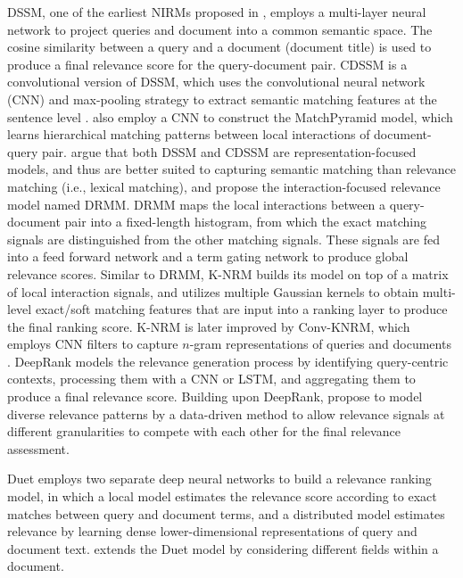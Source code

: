 \documentclass[11pt,a4paper]{article}
\begin{document}
DSSM, one of the earliest NIRMs proposed in \cite{DBLP:conf/cikm/HuangHGDAH13}, employs a multi-layer neural network to project queries and document into a common semantic space. The cosine similarity between a query and a document (document title) is used to produce a final relevance score for the query-document pair. CDSSM is a convolutional version of DSSM, which uses the convolutional neural network (CNN) and max-pooling strategy to extract semantic matching features at the sentence level \cite{DBLP:conf/www/ShenHGDM14}. \cite{DBLP:journals/corr/PangLGXC16} also employ a CNN to construct the MatchPyramid model, which learns hierarchical matching patterns between local interactions of document-query pair. \cite{DBLP:conf/cikm/GuoFAC16} argue that both DSSM and CDSSM are representation-focused models, and thus are better suited to capturing semantic matching than relevance matching (i.e., lexical matching), and propose the interaction-focused relevance model named DRMM. DRMM maps the local interactions between a query-document pair into a fixed-length histogram, from which the exact matching signals are distinguished from the other matching signals. These signals are fed into a feed forward network and a term gating network to produce global relevance scores. Similar to DRMM, K-NRM \cite{DBLP:conf/sigir/XiongDCLP17} builds its model on top of a matrix of local interaction signals, and utilizes multiple Gaussian kernels to obtain multi-level exact/soft matching features that are input into a ranking layer to produce the final ranking score. K-NRM is later improved by Conv-KNRM, which employs CNN filters to capture $n$-gram representations of queries and documents \cite{DBLP:conf/wsdm/DaiXC018}. DeepRank \cite{DBLP:conf/cikm/PangLGXXC17} models the relevance generation process by identifying query-centric contexts, processing them with a CNN or LSTM, and aggregating them to produce a final relevance score. Building upon DeepRank, \cite{DBLP:conf/sigir/FanGLXZC18} propose to model diverse relevance patterns by a data-driven method to allow relevance signals at different granularities to compete with each other for the final relevance assessment.

Duet \cite{DBLP:conf/www/Mitra0C17} employs two separate deep neural networks to build a relevance ranking model, in which a local model estimates the relevance score according to exact matches between query and document terms, and a distributed model estimates relevance by learning dense lower-dimensional representations of query and document text. \cite{DBLP:conf/wsdm/ZamaniMSCT18} extends the Duet model by considering different fields within a document. 
\end{document}
